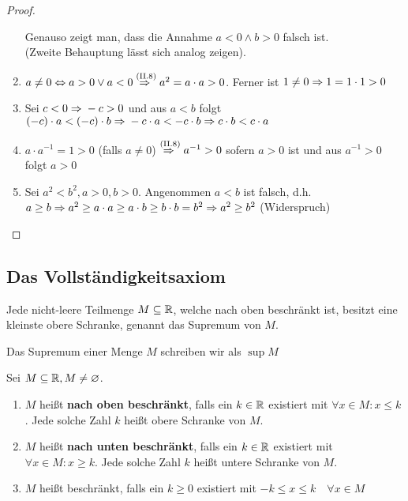 \begin{satz}
\begin{proof}
\begin{enumerate}[label=(II.\arabic*)]
            Genauso zeigt man, dass die Annahme $a<0 \land b > 0$ falsch ist.\\
            (Zweite Behauptung lässt sich analog zeigen).
            \item $a\neq 0 \Leftrightarrow{} a > 0 \lor a < 0 \overset{\text{(II.8)}}{\Rightarrow{}} a^2 = a \cdot a > 0$. Ferner ist $1\neq 0 \Rightarrow{} 1=1\cdot 1 > 0$
            \item Sei $c<0 \Rightarrow{} -c > 0$ und aus $a<b$ folgt $(-c)\cdot a < (-c)\cdot b \Rightarrow{} -c\cdot a < -c\cdot b \Rightarrow{} c\cdot b < c\cdot a$
            \item $a\cdot a^{-1} = 1 > 0$ (falls $a\neq 0$) $\overset{\text{(II.8)}}{\Rightarrow{}} a^{-1} > 0$ sofern $a>0$ ist und aus $a^{-1}>0$ folgt $a>0$
            \item Sei $a^{2}<b^2, a>0, b>0$. Angenommen $a<b$ ist falsch, d.h. $a\geq b \Rightarrow{} a^{2} \geq a \cdot a \geq a\cdot b\geq b\cdot b = b^{2}\Rightarrow{} a^{2}\geq b^{2}$ (Widerspruch)
        \end{enumerate}
    \end{proof}
\end{satz}

\newpage

\subsection{Das Vollständigkeitsaxiom}

\begin{axiom}[Vollständigkeitsaxiom]
    Jede nicht-leere Teilmenge $M\subseteq \mathbb{R}$, welche nach oben beschränkt ist, besitzt eine kleinste obere Schranke, genannt das Supremum von $M$.
\end{axiom}

\begin{notation}[Supremum]
    Das Supremum einer Menge $M$ schreiben wir als $\sup M$
\end{notation}

\begin{definition}
    Sei $M\subseteq \mathbb{R}, M\neq \varnothing$.
    \begin{enumerate}[label=(\roman*)]
        \item $M$ heißt \textbf{nach oben beschränkt}, falls ein $k\in\mathbb{R}$ existiert mit $\forall x\in M:x\leq k$.
        Jede solche Zahl $k$ heißt obere Schranke von $M$.
        \item $M$ heißt \textbf{nach unten beschränkt}, falls ein $k\in\mathbb{R}$ existiert mit $\forall x\in M:x\geq k$.
        Jede solche Zahl $k$ heißt untere Schranke von $M$.
        \item $M$ heißt beschränkt, falls ein $k\geq 0$ existiert mit $-k\leq x \leq k\quad \forall x\in M$
    \end{enumerate}
\end{definition}

